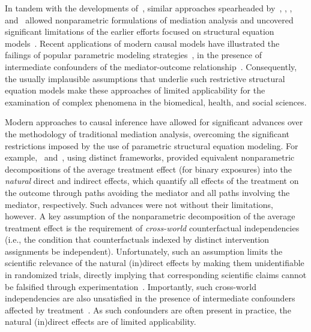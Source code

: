 In tandem with the developments of~\citet{pearl2000causality}, similar
approaches spearheaded by~\citet{robins1986new}, \citet{spirtes2000causation},
\citet{dawid2000causal}, and~\cite{richardson2013single} allowed nonparametric
formulations of mediation analysis and uncovered significant limitations of the
earlier efforts focused on structural equation models~\citep{pearl1998graphs,
imai2010general}. Recent applications of modern causal models have illustrated
the failings of popular parametric modeling
strategies~\citep[i.e.,][]{baron1986moderator}, in the presence of intermediate
confounders of the mediator-outcome relationship~\citep{cole2002fallibility}.
Consequently, the usually implausible assumptions that underlie such restrictive
structural equation models make these approaches of limited applicability for
the examination of complex phenomena in the biomedical, health, and social
sciences.

Modern approaches to causal inference have allowed for significant advances over
the methodology of traditional mediation analysis, overcoming the significant
restrictions imposed by the use of parametric structural equation modeling. For
example,~\citet{robins1992identifiability} and~\citet{pearl2001direct}, using
distinct frameworks, provided equivalent nonparametric decompositions of the
average treatment effect (for binary exposures) into the \textit{natural}
direct and indirect effects, which quantify all effects of the treatment on the
outcome through paths avoiding the mediator and all paths involving the
mediator, respectively. Such advances were not without their limitations,
however. A key assumption of the nonparametric decomposition of the average
treatment effect is the requirement of \textit{cross-world} counterfactual
independencies (i.e., the condition that counterfactuals indexed by distinct
intervention assignments be independent). Unfortunately, such an assumption
limits the scientific relevance of the natural (in)direct effects by making them
unidentifiable in randomized trials, directly implying that corresponding
scientific claims cannot be falsified through
experimentation~\citep{popper1934logic, dawid2000causal, robins2010alternative}.
Importantly, such cross-world independencies are also unsatisfied in the
presence of intermediate confounders affected by
treatment~\citep{avin2005identifiability, tchetgen2014identification}. As such
confounders are often present in practice, the natural (in)direct effects are
of limited applicability.

